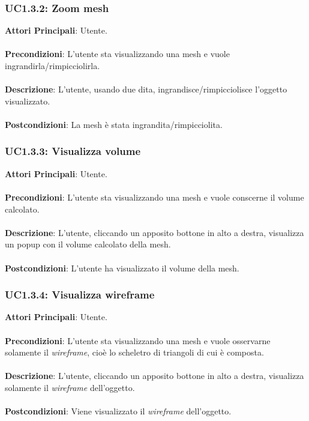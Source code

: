 \subsubsection{UC1.3.2: Zoom mesh}
\textbf{Attori Principali}: Utente.
\\\\ \textbf{Precondizioni}: L'utente sta visualizzando una mesh e vuole ingrandirla/rimpicciolirla.
\\\\ \textbf{Descrizione}: L'utente, usando due dita, ingrandisce/rimpicciolisce l'oggetto visualizzato.
\\\\ \textbf{Postcondizioni}: La mesh è stata ingrandita/rimpicciolita.

\subsubsection{UC1.3.3: Visualizza volume}
\textbf{Attori Principali}: Utente.
\\\\ \textbf{Precondizioni}: L'utente sta visualizzando una mesh e vuole conscerne il volume calcolato.
\\\\ \textbf{Descrizione}: L'utente, cliccando un apposito bottone in alto a destra, visualizza un popup con il volume calcolato della mesh.
\\\\ \textbf{Postcondizioni}: L'utente ha visualizzato il volume della mesh.

\subsubsection{UC1.3.4: Visualizza wireframe}
\textbf{Attori Principali}: Utente.
\\\\ \textbf{Precondizioni}: L'utente sta visualizzando una mesh e vuole osservarne solamente il \emph{wireframe}, cioè lo scheletro di triangoli di cui è composta.
\\\\ \textbf{Descrizione}: L'utente, cliccando un apposito bottone in alto a destra, visualizza solamente il \emph{wireframe} dell'oggetto.
\\\\ \textbf{Postcondizioni}: Viene visualizzato il \emph{wireframe} dell'oggetto.

